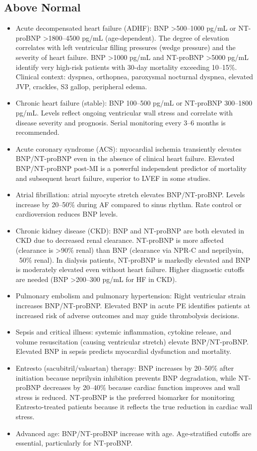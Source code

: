 \subsection*{Above Normal}
\begin{itemize}
  \item Acute decompensated heart failure (ADHF): BNP >500--1000 pg/mL or NT-proBNP >1800--4500 pg/mL (age-dependent). The degree of elevation correlates with left ventricular filling pressures (wedge pressure) and the severity of heart failure. BNP >1000 pg/mL and NT-proBNP >5000 pg/mL identify very high-risk patients with 30-day mortality exceeding 10--15\%. Clinical context: dyspnea, orthopnea, paroxysmal nocturnal dyspnea, elevated JVP, crackles, S3 gallop, peripheral edema.
  \item Chronic heart failure (stable): BNP 100--500 pg/mL or NT-proBNP 300--1800 pg/mL. Levels reflect ongoing ventricular wall stress and correlate with disease severity and prognosis. Serial monitoring every 3--6 months is recommended.
  \item Acute coronary syndrome (ACS): myocardial ischemia transiently elevates BNP/NT-proBNP even in the absence of clinical heart failure. Elevated BNP/NT-proBNP post-MI is a powerful independent predictor of mortality and subsequent heart failure, superior to LVEF in some studies.
  \item Atrial fibrillation: atrial myocyte stretch elevates BNP/NT-proBNP. Levels increase by 20--50\% during AF compared to sinus rhythm. Rate control or cardioversion reduces BNP levels.
  \item Chronic kidney disease (CKD): BNP and NT-proBNP are both elevated in CKD due to decreased renal clearance. NT-proBNP is more affected (clearance is >90\% renal) than BNP (clearance via NPR-C and neprilysin, ~50\% renal). In dialysis patients, NT-proBNP is markedly elevated and BNP is moderately elevated even without heart failure. Higher diagnostic cutoffs are needed (BNP >200--300 pg/mL for HF in CKD).
  \item Pulmonary embolism and pulmonary hypertension: Right ventricular strain increases BNP/NT-proBNP. Elevated BNP in acute PE identifies patients at increased risk of adverse outcomes and may guide thrombolysis decisions.
  \item Sepsis and critical illness: systemic inflammation, cytokine release, and volume resuscitation (causing ventricular stretch) elevate BNP/NT-proBNP. Elevated BNP in sepsis predicts myocardial dysfunction and mortality.
  \item Entresto (sacubitril/valsartan) therapy: BNP increases by 20--50\% after initiation because neprilysin inhibition prevents BNP degradation, while NT-proBNP decreases by 20--40\% because cardiac function improves and wall stress is reduced. NT-proBNP is the preferred biomarker for monitoring Entresto-treated patients because it reflects the true reduction in cardiac wall stress.
  \item Advanced age: BNP/NT-proBNP increase with age. Age-stratified cutoffs are essential, particularly for NT-proBNP.
\end{itemize}

